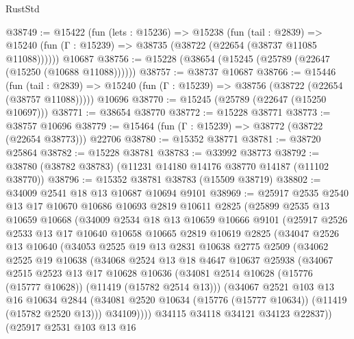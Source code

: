 \begin{lexlean}{RustStd}
\begin{coremodule}
@38749 := @15422
    (fun (lets : @15236) =>
    @15238
      (fun (tail : @2839) =>
      @15240 (fun (Γ : @15239) => @38735 (@38722 (@22654 (@38737 @11085 @11088))))))
    @10687
@38756 := @15228 (@38654 (@15245 (@25789 (@22647 (@15250 (@10688 @11088))))))
@38757 := @38737 @10687
@38766 := @15446
    (fun (tail : @2839) => @15240 (fun (Γ : @15239) => @38756 (@38722 (@22654 (@38757 @11088)))))
    @10696
@38770 := @15245 (@25789 (@22647 (@15250 @10697)))
@38771 := @38654 @38770
@38772 := @15228 @38771
@38773 := @38757 @10696
@38779 := @15464 (fun (Γ : @15239) => @38772 (@38722 (@22654 @38773))) @22706
@38780 := @15352 @38771
@38781 := @38720 @25864
@38782 := @15228 @38781
@38783 := @33992 @38773
@38792 := @38780 (@38782 @38783) (@11231 @14180 @14176 @38770 @14187 (@11102 @38770))
@38796 := @15352 @38781 @38783 (@15509 @38719)
@38802 := @34009 @2541 @18 @13 @10687 @10694 @9101
@38969 := @25917
    @2535
    @2540
    @13
    @17
    @10670
    @10686
    @10693
    @2819
    @10611
    @2825
    (@25899
      @2535
      @13
      @10659
      @10668
      (@34009
        @2534
        @18
        @13
        @10659
        @10666
        @9101
        (@25917
          @2526
          @2533
          @13
          @17
          @10640
          @10658
          @10665
          @2819
          @10619
          @2825
          (@34047
            @2526
            @13
            @10640
            (@34053
              @2525
              @19
              @13
              @2831
              @10638
              @2775
              @2509
              (@34062
                @2525
                @19
                @10638
                (@34068
                  @2524
                  @13
                  @18
                  @4647
                  @10637
                  @25938
                  (@34067
                    @2515
                    @2523
                    @13
                    @17
                    @10628
                    @10636
                    (@34081 @2514 @10628 (@15776 (@15777 @10628)) (@11419 (@15782 @2514 @13)))
                    (@34067
                      @2521
                      @103
                      @13
                      @16
                      @10634
                      @2844
                      (@34081 @2520 @10634 (@15776 (@15777 @10634)) (@11419 (@15782 @2520 @13)))
                      @34109))))
              @34115
              @34118
              @34121
              @34123
              @22837))
          (@25917
            @2531
            @103
            @13
            @16

\end{coremodule}
\end{lexlean}
